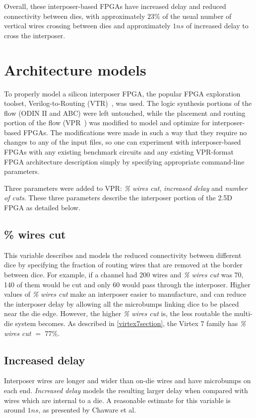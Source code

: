 \documentclass{sig-alternate-2013}
\begin{document}
Overall, these interposer-based FPGAs have increased delay and reduced connectivity between dies, with approximately $23\%$ of the usual number of vertical wires crossing between dies and approximately $1ns$ of increased delay to cross the interposer.

\section{Architecture models}
\label{archSection}
To properly model a silicon interposer FPGA, the popular FPGA exploration toolset, Verilog-to-Routing (VTR)~\cite{vtr2012}, was used. The logic synthesis portions of the flow (ODIN II and  ABC) were left untouched, while the placement and routing portion of the flow (VPR~\cite{betz1997vpr}) was modified to model and optimize for interposer-based FPGAs. The modifications were made in such a way that they require no changes to any of the input files, so one can experiment with interposer-based FPGAs with any existing benchmark circuits and any existing VPR-format FPGA architecture description simply by specifying appropriate command-line parameters.

Three parameters were added to VPR: \textit{\% wires cut}, \textit{increased delay} and \textit{number of cuts}. These three parameters describe the interposer portion of the 2.5D FPGA as detailed below.

\subsection{\% wires cut}
This variable describes and models the reduced connectivity between different dice by specifying the fraction of routing wires that are removed at the border between dice. For example, if a channel had 200 wires and \textit{\% wires cut} was 70, 140 of them would be cut and only 60 would pass through the interposer. Higher values of \textit{\% wires cut} make an interposer easier to manufacture, and can reduce the interposer delay by allowing all the microbumps linking dice to be placed near the die edge. However, the higher \textit{\% wires cut} is, the less routable the multi-die system becomes. As described in \ref{virtex7section}, the Virtex 7 family has \textit{\% wires cut} $=$ 77\%.

\subsection{Increased delay}
Interposer wires are longer and wider than on-die wires and have microbumps on each end. \textit{Increased delay} models the resulting larger delay when compared with wires which are internal to a die. A reasonable estimate for this variable is around $1ns$, as presented by Chaware et al\cite{xilinxTSV}.
\end{document}
